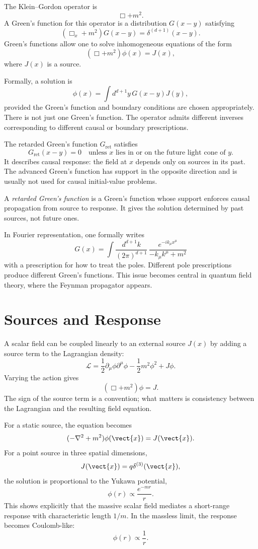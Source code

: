 The Klein--Gordon operator is
\[
    \Box+m^2.
\]
A Green's function for this operator is a distribution \(G(x-y)\) satisfying
\[
    (\Box_x+m^2)G(x-y)=\delta^{(d+1)}(x-y).
\]
Green's functions allow one to solve inhomogeneous equations of the form
\[
    (\Box+m^2)\phi(x)=J(x),
\]
where \(J(x)\) is a source.

Formally, a solution is
\[
    \phi(x)=\int d^{d+1}y\,G(x-y)J(y),
\]
provided the Green's function and boundary conditions are chosen appropriately.
There is not just one Green's function. The operator admits different inverses
corresponding to different causal or boundary prescriptions.

The retarded Green's function \(G_{\mathrm{ret}}\) satisfies
\[
    G_{\mathrm{ret}}(x-y)=0
    \quad\text{unless }x\text{ lies in or on the future light cone of }y.
\]
It describes causal response: the field at \(x\) depends only on sources in its
past. The advanced Green's function has support in the opposite direction and is
usually not used for causal initial-value problems.

\begin{definitionbox}
A \emph{retarded Green's function} is a Green's function whose support enforces
causal propagation from source to response. It gives the solution determined by
past sources, not future ones.
\end{definitionbox}

In Fourier representation, one formally writes
\[
    G(x)=\int \frac{d^{d+1}k}{(2\pi)^{d+1}}\,
    \frac{e^{-ik_\mu x^\mu}}{-k_\mu k^\mu+m^2}
\]
with a prescription for how to treat the poles. Different pole prescriptions
produce different Green's functions. This issue becomes central in quantum field
theory, where the Feynman propagator appears.

\section{Sources and Response}

A scalar field can be coupled linearly to an external source \(J(x)\) by adding
a source term to the Lagrangian density:
\[
    \mathcal{L}
    =\frac{1}{2}\partial_\mu\phi\partial^\mu\phi
     -\frac{1}{2}m^2\phi^2
     +J\phi.
\]
Varying the action gives
\[
    (\Box+m^2)\phi=J.
\]
The sign of the source term is a convention; what matters is consistency between
the Lagrangian and the resulting field equation.

For a static source, the equation becomes
\[
    (-\nabla^2+m^2)\phi(\vect{x})=J(\vect{x}).
\]
For a point source in three spatial dimensions,
\[
    J(\vect{x})=q\delta^{(3)}(\vect{x}),
\]
the solution is proportional to the Yukawa potential,
\[
    \phi(r)\propto \frac{e^{-mr}}{r}.
\]
This shows explicitly that the massive scalar field mediates a short-range
response with characteristic length \(1/m\). In the massless limit, the response
becomes Coulomb-like:
\[
    \phi(r)\propto \frac{1}{r}.
\]

